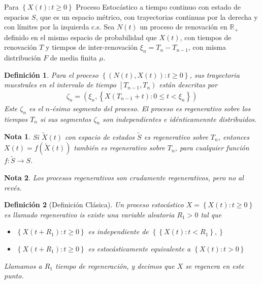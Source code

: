 \documentclass{article}
\newtheorem{Def}{Definición}[section]
\newtheorem{Note}{Nota}[section]
\newcommand{\rea}{\mathbb{R}}
\numberwithin{equation}{section}
\begin{document}
Para $\left\{X\left(t\right):t\geq0\right\}$ Proceso Estoc\'astico a tiempo continuo con estado de espacios $S$, que es un espacio m\'etrico, con trayectorias continuas por la derecha y con l\'imites por la izquierda c.s. Sea $N\left(t\right)$ un proceso de renovaci\'on en $\rea_{+}$ definido en el mismo espacio de probabilidad que $X\left(t\right)$, con tiempos de renovaci\'on $T$ y tiempos de inter-renovaci\'on $\xi_{n}=T_{n}-T_{n-1}$, con misma distribuci\'on $F$ de media finita $\mu$.



\begin{Def}
Para el proceso $\left\{\left(N\left(t\right),X\left(t\right)\right):t\geq0\right\}$, sus trayectoria muestrales en el intervalo de tiempo $\left[T_{n-1},T_{n}\right)$ est\'an descritas por
\begin{eqnarray*}
\zeta_{n}=\left(\xi_{n},\left\{X\left(T_{n-1}+t\right):0\leq t<\xi_{n}\right\}\right)
\end{eqnarray*}
Este $\zeta_{n}$ es el $n$-\'esimo segmento del proceso. El proceso es regenerativo sobre los tiempos $T_{n}$ si sus segmentos $\zeta_{n}$ son independientes e id\'enticamennte distribuidos.
\end{Def}


\begin{Note}
Si $\tilde{X}\left(t\right)$ con espacio de estados $\tilde{S}$ es regenerativo sobre $T_{n}$, entonces $X\left(t\right)=f\left(\tilde{X}\left(t\right)\right)$ tambi\'en es regenerativo sobre $T_{n}$, para cualquier funci\'on $f:\tilde{S}\rightarrow S$.
\end{Note}

\begin{Note}
Los procesos regenerativos son crudamente regenerativos, pero no al rev\'es.
\end{Note}

\begin{Def}[Definici\'on Cl\'asica]
Un proceso estoc\'astico $X=\left\{X\left(t\right):t\geq0\right\}$ es llamado regenerativo is existe una variable aleatoria $R_{1}>0$ tal que
\begin{itemize}
\item[i)] $\left\{X\left(t+R_{1}\right):t\geq0\right\}$ es independiente de $\left\{\left\{X\left(t\right):t<R_{1}\right\},\right\}$
\item[ii)] $\left\{X\left(t+R_{1}\right):t\geq0\right\}$ es estoc\'asticamente equivalente a $\left\{X\left(t\right):t>0\right\}$
\end{itemize}

Llamamos a $R_{1}$ tiempo de regeneraci\'on, y decimos que $X$ se regenera en este punto.
\end{Def}
\end{document}
